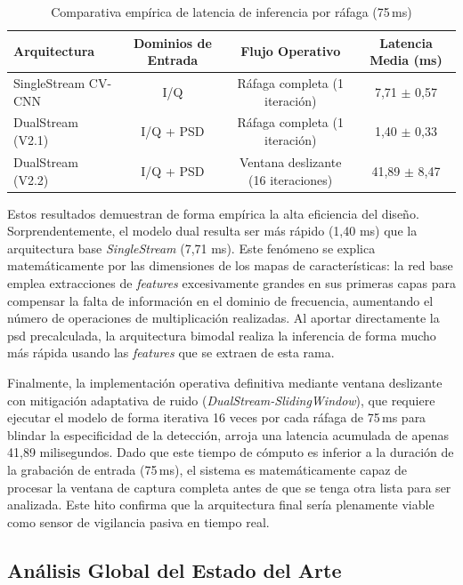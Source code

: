 \begin{table}[htbp]
\centering
\caption{Comparativa empírica de latencia de inferencia por ráfaga (75\,ms)}
\label{tab:latency_benchmark}
\begin{tabular}{l c c c}
\toprule
\textbf{Arquitectura} & \textbf{Dominios de Entrada} & \textbf{Flujo Operativo} & \textbf{Latencia Media (ms)} \\
\midrule
SingleStream CV-CNN & I/Q & Ráfaga completa (1 iteración) & 7,71 $\pm$ 0,57 \\
DualStream (V2.1) & I/Q + PSD & Ráfaga completa (1 iteración) & 1,40 $\pm$ 0,33 \\
DualStream (V2.2) & I/Q + PSD & Ventana deslizante (16 iteraciones) & 41,89 $\pm$ 8,47 \\
\bottomrule
\end{tabular}
\end{table}

Estos resultados demuestran de forma empírica la alta eficiencia del diseño. Sorprendentemente, el modelo dual resulta ser más rápido (1,40 ms) que la arquitectura base \textit{SingleStream} (7,71 ms). Este fenómeno se explica matemáticamente por las dimensiones de los mapas de características: la red base emplea extracciones de \textit{features} excesivamente grandes en sus primeras capas para compensar la falta de información en el dominio de frecuencia, aumentando el número de operaciones de multiplicación realizadas. Al aportar directamente la \gls{psd} precalculada, la arquitectura bimodal realiza la inferencia de forma mucho más rápida usando las \textit{features} que se extraen de esta rama.

Finalmente, la implementación operativa definitiva mediante ventana deslizante con mitigación adaptativa de ruido (\textit{DualStream-SlidingWindow}), que requiere ejecutar el modelo de forma iterativa 16 veces por cada ráfaga de 75\,ms para blindar la especificidad de la detección, arroja una latencia acumulada de apenas 41,89 milisegundos. Dado que este tiempo de cómputo es inferior a la duración de la grabación de entrada (75\,ms), el sistema es matemáticamente capaz de procesar la ventana de captura completa antes de que se tenga otra lista para ser analizada. Este hito confirma que la arquitectura final sería plenamente viable como sensor de vigilancia pasiva en tiempo real.

\subsection{Análisis Global del Estado del Arte}
\label{subsec:disc_sota}

